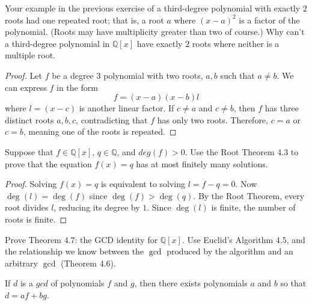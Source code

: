 \begin{tcolorbox}[title=Problem 4, breakable]
    Your example in the previous exercise of a third-degree polynomial with 
    exactly $2$ roots had one repeated root; that is, a root $a$ where $(x - a)^2$
    is a factor of the polynomial. (Roots may have multiplicity greater than two 
    of course.) Why can't a third-degree polynomial in $\mathbb{Q}[x]$ have 
    exactly $2$ roots where neither is a multiple root.
\end{tcolorbox}

\begin{proof}
    Let $f$ be a degree $3$ polynomial with two roots, $a, b$
        such that $a \ne b$.
    We can express $f$ in the form 
    \[f = (x - a)(x - b)l\]
    where $l = (x - c)$ is another linear factor.
    If $c \ne a$ and $c \ne b$, then $f$ has three distinct roots $a, b, c$,
        contradicting that $f$ has only two roots.
    Therefore, $c = a$ or $c = b$, meaning one of the roots is repeated.
\end{proof}

\begin{tcolorbox}[title=Problem 6, breakable]
    Suppose that $f \in \mathbb{Q}[x]$, $q \in \mathbb{Q}$,
    and $deg(f) > 0$. Use the Root Theorem $4.3$ to prove that
    the equation $f(x) = q$ has at most finitely many solutions.
\end{tcolorbox}

\begin{proof}
    Solving $f(x) = q$ is equivalent to solving $l = f - q = 0$.
    Now $\deg(l) = \deg(f)$ since $\deg(f) > \deg(q)$.
    By the Root Theorem, every root divides $l$,
        reducing its degree by $1$.
    Since $\deg(l)$ is finite, the number of roots is 
        finite.
\end{proof}

\begin{tcolorbox}[title=Problem 8, breakable]
    Prove Theorem $4.7$: the GCD identity for $\mathbb{Q}[x]$.
    Use Euclid's Algorithm $4.5$, and the relationship we know 
    between the $\gcd$ produced by the algorithm and an arbitrary $\gcd$ (Theorem $4.6$).
\end{tcolorbox}

\begin{theorem}
    If $d$ is a $gcd$  of polynomials $f$ and $g$,
        then there exists polynomials $a$ and $b$
        so that $d = af + bg$.
\end{theorem}


